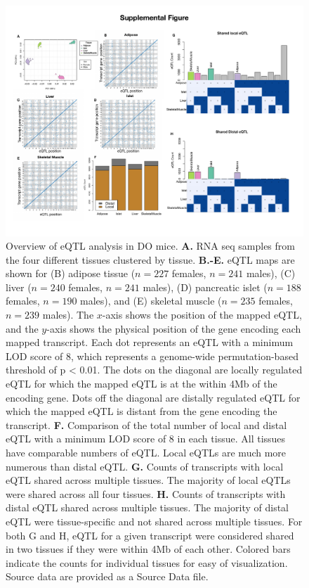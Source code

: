 \documentclass[
]{article}
\begin{document}
\begin{figure}[ht!]
\includegraphics[width=\textwidth]{Figures/Supp_Fig_eQTL.pdf} 
\caption{Overview of eQTL analysis in DO mice. \textbf{A.} RNA seq 
samples from the four different tissues clustered by tissue. 
\textbf{B.-E.} eQTL maps are shown for (B) adipose tissue 
($n = 227$ females, $n = 241$ males), (C) liver ($n = 240$ females,
$n = 241$ males), (D) pancreatic islet ($n = 188$ females, $n = 
190$ males), and (E) skeletal muscle ($n = 235$ females, $n = 239$
males). The $x$-axis 
shows the position of the mapped eQTL, and the $y$-axis shows the 
physical position of the gene encoding each mapped transcript. 
Each dot represents an eQTL with a minimum LOD score of 8, which 
represents a genome-wide permutation-based threshold of p < 0.01. The 
dots on the diagonal are locally regulated eQTL for which the mapped 
eQTL is at the within 4Mb of the encoding gene. Dots off the diagonal 
are distally regulated eQTL for which the mapped eQTL is distant from 
the gene encoding the transcript. \textbf{F.} Comparison of the total 
number of local and distal eQTL with a minimum LOD score of 8 in each 
tissue. All tissues have comparable numbers of eQTL. Local eQTLs are 
much more numerous than distal eQTL. \textbf{G.} Counts of transcripts 
with local eQTL shared across multiple tissues. The majority of local 
eQTLs were shared across all four tissues. \textbf{H.} Counts of 
transcripts with distal eQTL shared across multiple tissues. The majority 
of distal eQTL were tissue-specific and not shared across multiple tissues. 
For both G and H, eQTL for a given transcript were considered shared in two 
tissues if they were within 4Mb of each other. Colored bars indicate the 
counts for individual tissues for easy of visualization. Source data are 
provided as a Source Data file.
}
\label{fig:eQTL}
\end{figure}
\end{document}
